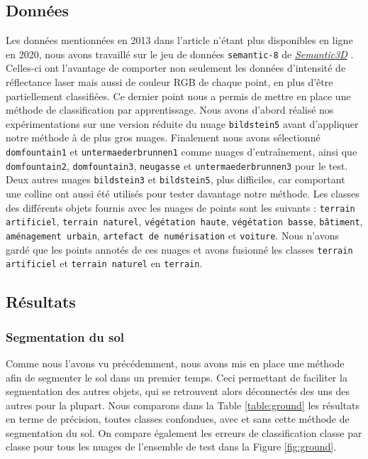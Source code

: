 \documentclass[a4paper, onecolumn, 11pt]{article}
\begin{document}
\subsection{Données}
\label{partie-donnees}
Les données mentionnées en 2013 dans l'article \cite{aka_article} n'étant plus disponibles en ligne en 2020, nous avons travaillé sur le jeu de données \texttt{semantic-8} de \href{http://www.semantic3d.net/}{\emph{Semantic3D}} \cite{hackel2017isprs}. Celles-ci ont l'avantage de comporter non seulement les données d'intensité de réflectance laser mais aussi de couleur RGB de chaque point, en plus d'être partiellement classifiées. Ce dernier point nous a permis de mettre en place une méthode de classification par apprentissage.
Nous avons d'abord réalisé nos expérimentations sur une version réduite du nuage \texttt{bildstein5} avant d'appliquer notre méthode à de plus gros nuages. Finalement nous avons sélectionné \texttt{domfountain1} et \texttt{untermaederbrunnen1} comme nuages d'entraînement, ainsi que \texttt{domfountain2}, \texttt{domfountain3}, \texttt{neugasse} et \texttt{untermaederbrunnen3} pour le test. Deux autres nuages \texttt{bildstein3} et \texttt{bildstein5}, plus difficiles, car comportant une colline ont aussi été utilisés pour tester davantage notre méthode. Les classes des différents objets fournis avec les nuages de points sont les suivants : \texttt{terrain artificiel}, \texttt{terrain naturel}, \texttt{végétation haute}, \texttt{végétation basse}, \texttt{bâtiment}, \texttt{aménagement urbain}, \texttt{artefact de numérisation} et \texttt{voiture}. Nous n'avons gardé que les points annotés de ces nuages et avons fusionné les classes \texttt{terrain artificiel} et \texttt{terrain naturel} en \texttt{terrain}.

\subsection{Résultats}

\subsubsection{Segmentation du sol}

Comme nous l'avons vu précédemment, nous avons mis en place une méthode afin de segmenter le sol dans un premier temps. Ceci permettant de faciliter la segmentation des autres objets, qui se retrouvent alors déconnectés des uns des autres pour la plupart. Nous comparons dans la Table \ref{table:ground} les résultats en terme de précision, toutes classes confondues, avec et sans cette méthode de segmentation du sol. On compare également les erreurs de classification classe par classe pour tous les nuages de l'ensemble de test dans la Figure \ref{fig:ground}.
\end{document}
